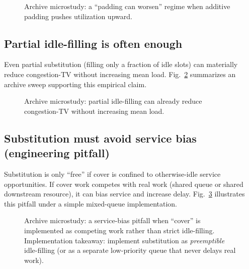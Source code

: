 \documentclass[11pt]{article}
\theoremstyle{definition}
\theoremstyle{remark}
\begin{document}
\begin{figure}[t]
\centering
{}
\caption{Archive microstudy: a ``padding can worsen'' regime when additive padding pushes utilization upward.}
\label{fig:worsens}
\end{figure}

\subsection{Partial idle-filling is often enough}
Even partial substitution (filling only a fraction of idle slots) can materially reduce congestion-TV without increasing mean load.
Fig.~\ref{fig:idle} summarizes an archive sweep supporting this empirical claim.

\begin{figure}[t]
\centering
{}
\caption{Archive microstudy: partial idle-filling can already reduce congestion-TV without increasing mean load.}
\label{fig:idle}
\end{figure}

\subsection{Substitution must avoid service bias (engineering pitfall)}
Substitution is only ``free'' if cover is confined to otherwise-idle service opportunities.
If cover work competes with real work (shared queue or shared downstream resource), it can bias service and increase delay.
Fig.~\ref{fig:servicebias} illustrates this pitfall under a simple mixed-queue implementation.

\begin{figure}[t]
\centering
{}
\caption{Archive microstudy: a service-bias pitfall when ``cover'' is implemented as competing work rather than strict idle-filling.
Implementation takeaway: implement substitution as \emph{preemptible} idle-filling (or as a separate low-priority queue that never delays real work).}
\label{fig:servicebias}
\end{figure}
\end{document}
